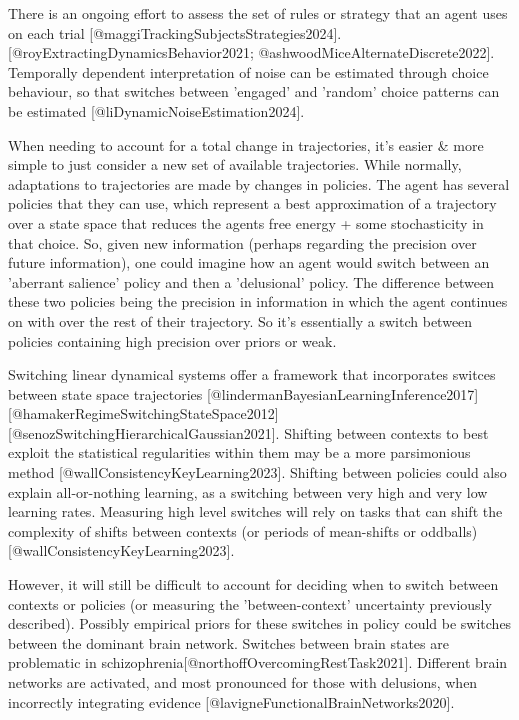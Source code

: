 \documentclass{article}
\begin{document}
There is an ongoing effort to assess the set of rules or strategy that an agent uses on each trial [@maggiTrackingSubjectsStrategies2024]. [@royExtractingDynamicsBehavior2021; @ashwoodMiceAlternateDiscrete2022]. Temporally dependent interpretation of noise can be estimated through choice behaviour, so that switches between 'engaged' and 'random' choice patterns can be estimated [@liDynamicNoiseEstimation2024].

When needing to account for a total change in trajectories, it's easier & more simple to just consider a new set of available trajectories. While normally, adaptations to trajectories are made by changes in policies. The agent has several policies that they can use, which represent a best approximation of a trajectory over a state space that reduces the agents free energy + some stochasticity in that choice. So, given new information (perhaps regarding the precision over future information), one could imagine how an agent would switch between an 'aberrant salience' policy and then a 'delusional' policy. The difference between these two policies being the precision in information in which the agent continues on with over the rest of their trajectory. So it's essentially a switch between policies containing high precision over priors or weak.

Switching linear dynamical systems offer a framework that incorporates switces between state space trajectories [@lindermanBayesianLearningInference2017] [@hamakerRegimeSwitchingStateSpace2012] [@senozSwitchingHierarchicalGaussian2021]. Shifting between contexts to best exploit the statistical regularities within them may be a more parsimonious method [@wallConsistencyKeyLearning2023]. Shifting between policies could also explain all-or-nothing learning, as a switching between very high and very low learning rates. Measuring high level switches will rely on tasks that can shift the complexity of shifts between contexts (or periods of mean-shifts or oddballs) [@wallConsistencyKeyLearning2023].

However, it will still be difficult to account for deciding when to switch between contexts or policies (or measuring the 'between-context' uncertainty previously described). Possibly empirical priors for these switches in policy could be switches between the dominant brain network. Switches between brain states are problematic in schizophrenia[@northoffOvercomingRestTask2021]. Different brain networks are activated, and most pronounced for those with delusions, when incorrectly integrating evidence [@lavigneFunctionalBrainNetworks2020].
\end{document}
